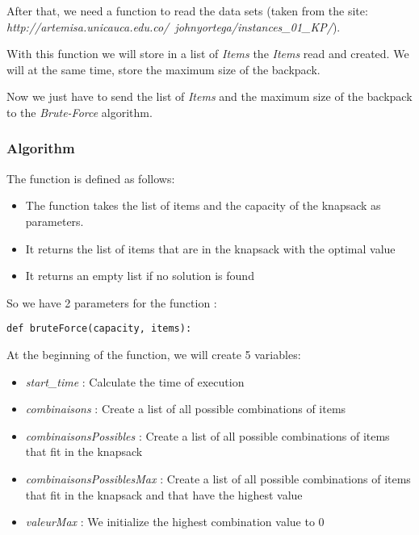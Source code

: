 \documentclass[12pt]{article}
\begin{document}
            After that, we need a function to read the data sets (taken from the site: \emph{http://artemisa.unicauca.edu.co/~johnyortega/instances\_01\_KP/}).\newline

            With this function we will store in a list of \emph{Items} the \emph{Items} read and created. We will at the same time, store the maximum size of the backpack.\newline

            Now we just have to send the list of \emph{Items} and the maximum size of the backpack to the \emph{Brute-Force} algorithm.
            
        \subsubsection{Algorithm}
        
            The function is defined as follows:
            \begin{itemize}
                \item The function takes the list of items and the capacity of the knapsack as parameters.
                \item It returns the list of items that are in the knapsack with the optimal value
                \item It returns an empty list if no solution is found
            \end{itemize}
            
            So we have 2 parameters for the function :

            \bigskip
            \begin{lstlisting}
def bruteForce(capacity, items):
            \end{lstlisting}
            \bigskip
            
            At the beginning of the function, we will create 5 variables:
            \begin{itemize}
                \item \emph{start\_time} : Calculate the time of execution
                \item \emph{combinaisons} : Create a list of all possible combinations of items
                \item \emph{combinaisonsPossibles} : Create a list of all possible combinations of items that fit in the knapsack
                \item \emph{combinaisonsPossiblesMax} : Create a list of all possible combinations of items that fit in the knapsack and that have the highest value
                \item \emph{valeurMax} : We initialize the highest combination value to 0
            \end{itemize}
\end{document}
